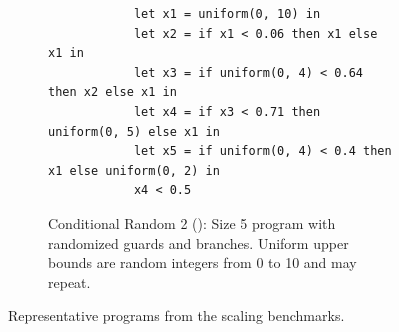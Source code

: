 \begin{figure}
    \begin{subfigure}{\textwidth}
        \begin{lstlisting}
            let x1 = uniform(0, 10) in
            let x2 = if x1 < 0.06 then x1 else x1 in
            let x3 = if uniform(0, 4) < 0.64 then x2 else x1 in
            let x4 = if x3 < 0.71 then uniform(0, 5) else x1 in
            let x5 = if uniform(0, 4) < 0.4 then x1 else uniform(0, 2) in
            x4 < 0.5
        \end{lstlisting}
        \caption{Conditional Random 2 (): Size 5 program with randomized guards and branches. Uniform upper bounds are random integers from 0 to 10 and may repeat.}
        \label{fig:cond-benchmarks-d-example}
    \end{subfigure}
    \caption{Representative programs from the scaling benchmarks.}
    \label{fig:cond-benchmark-examples}
\end{figure}

